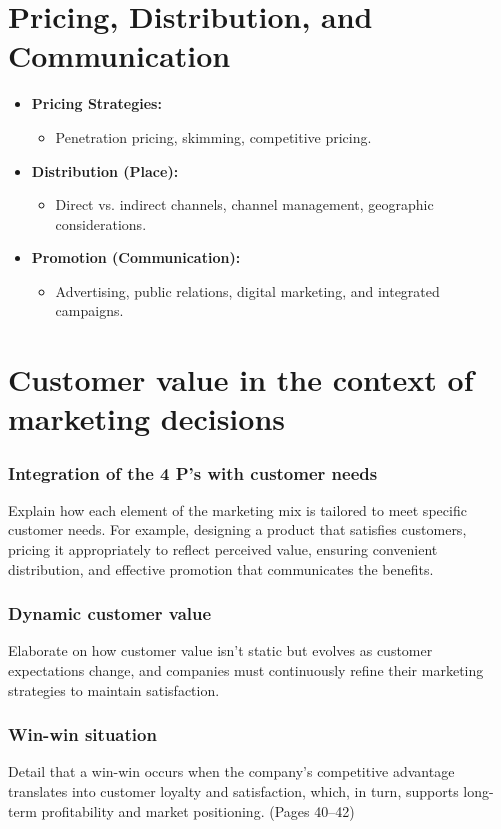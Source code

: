 \documentclass[12pt,a4paper]{report}
\begin{document}
\section{Pricing, Distribution, and Communication}
\begin{itemize}
    \item \textbf{Pricing Strategies:}
         \begin{itemize}
             \item Penetration pricing, skimming, competitive pricing.
         \end{itemize}
    \item \textbf{Distribution (Place):}
         \begin{itemize}
             \item Direct vs. indirect channels, channel management, geographic considerations.
         \end{itemize}
    \item \textbf{Promotion (Communication):}
         \begin{itemize}
             \item Advertising, public relations, digital marketing, and integrated campaigns.
         \end{itemize}
\end{itemize}

\section{Customer value in the context of marketing decisions}
\subsubsection{Integration of the 4 P's with customer needs}
Explain how each element of the marketing mix is tailored to meet specific customer needs. For example, designing a product that satisfies customers, pricing it appropriately to reflect perceived value, ensuring convenient distribution, and effective promotion that communicates the benefits.

\subsubsection{Dynamic customer value}
Elaborate on how customer value isn’t static but evolves as customer expectations change, and companies must continuously refine their marketing strategies to maintain satisfaction.

\subsubsection{Win-win situation}
Detail that a win-win occurs when the company's competitive advantage translates into customer loyalty and satisfaction, which, in turn, supports long-term profitability and market positioning.
(Pages 40--42)
\end{document}
